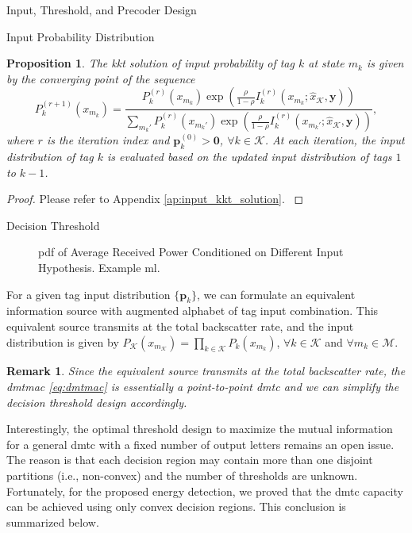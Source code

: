 \documentclass[journal]{IEEEtran}
\newtheorem{proposition}{Proposition}
\newtheorem{remark}{Remark}
\begin{document}
\begin{section}{Input, Threshold, and Precoder Design}
\begin{subsection}{Input Probability Distribution}
		\begin{proposition}
			The \gls{kkt} solution of input probability of tag $k$ at state $m_k$ is given by the converging point of the sequence
			\begin{equation}
				P_k^{(r+1)}(x_{m_k}) = \frac{P_k^{(r)}(x_{m_k}) \exp \left( \frac{\rho}{1 - \rho} I_k^{(r)}(x_{m_k};\hat{x}_{\mathcal{K}},\boldsymbol{y}) \right)}{\sum_{m_k'} P_k^{(r)}(x_{m_k'}) \exp \left( \frac{\rho}{1 - \rho} I_k^{(r)}(x_{m_k'};\hat{x}_{\mathcal{K}},\boldsymbol{y}) \right)},
				\label{eq:input_kkt_solution}
			\end{equation}
			where $r$ is the iteration index and $\boldsymbol{p}_k^{(0)} > \boldsymbol{0}$, $\forall k \in \mathcal{K}$.
			At each iteration, the input distribution of tag $k$ is evaluated based on the updated input distribution of tags $1$ to $k-1$.
			\label{pr:input_kkt_solution}
		\end{proposition}
		\begin{proof}
			Please refer to Appendix \ref{ap:input_kkt_solution}.
			\label{pf:input_kkt_solution}
		\end{proof}
	\end{subsection}


	\begin{subsection}{Decision Threshold}
		\begin{figure}[!t]
			\centering
			\resizebox{0.95\columnwidth}{!}{
				
			}
			\caption{\gls{pdf} of Average Received Power Conditioned on Different Input Hypothesis. Example \gls{ml}.}
		\end{figure}

		For a given tag input distribution $\{\boldsymbol{p}_k\}$, we can formulate an equivalent information source with augmented alphabet of tag input combination.
		This equivalent source transmits at the total backscatter rate, and the input distribution is given by $P_{\mathcal{K}}(x_{m_{\mathcal{K}}}) = \prod_{k \in \mathcal{K}} P_k(x_{m_k})$, $\forall k \in \mathcal{K}$ and $\forall m_k \in \mathcal{M}$.

		\begin{remark}
			Since the equivalent source transmits at the total backscatter rate, the \gls{dmtmac} \eqref{eq:dmtmac} is essentially a point-to-point \gls{dmtc} and we can simplify the decision threshold design accordingly.
			\label{re:input_combination}
		\end{remark}

		Interestingly, the optimal threshold design to maximize the mutual information for a general \gls{dmtc} with a fixed number of output letters remains an open issue.
		The reason is that each decision region may contain more than one disjoint partitions (i.e., non-convex) and the number of thresholds are unknown.
		Fortunately, for the proposed energy detection, we proved that the \gls{dmtc} capacity can be achieved using only convex decision regions.
		This conclusion is summarized below.


\end{subsection}
\end{section}
\end{document}
